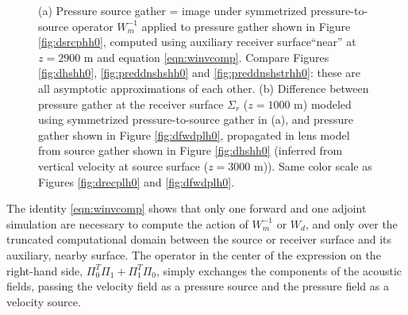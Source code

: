 \documentclass[12pt]{geophysics}
\begin{document}
\begin{figure}
  \centering
  \caption{(a) Pressure source gather = image
  under symmetrized pressure-to-source operator $W_m^{-1}$ applied to pressure gather
  shown in Figure \ref{fig:dsrcphh0}, computed using
  auxiliary receiver surface``near''  at $z=2900$ m and 
  equation \ref{eqn:winvcomp}. Compare Figures
  \ref{fig:dhshh0}, \ref{fig:preddnshshh0} and
  \ref{fig:preddnshstrhh0}: these are all asymptotic approximations of
  each other. (b) Difference between pressure gather at the receiver
  surface $\Sigma_r$  ($z=1000$ m) modeled using symmetrized
  pressure-to-source gather in (a), and pressure gather shown in Figure \ref{fig:dfwdplh0},
  propagated in lens model from 
  source gather shown in Figure \ref{fig:dhshh0} (inferred from vertical velocity at source
  surface ($z=3000$ m)). Same color scale as
  Figures \ref{fig:drecplh0} and \ref{fig:dfwdplh0}.}
\end{figure}

The identity \ref{eqn:winvcomp} shows that only one forward and one adjoint simulation
are necessary to compute the action of $W_m^{-1}$ or $W_d$, and only
over the truncated computational domain between the source or receiver
surface and its auxiliary, nearby surface. The operator
in the center of the expression on the right-hand side, $\Pi_0^T\Pi_1
+ \Pi_1^T\Pi_0$, simply exchanges the components of the acoustic
fields, passing the velocity field as a pressure source and the
pressure field as a velocity source.
\end{document}
